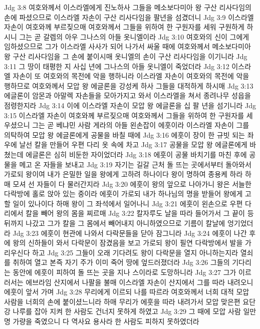 Jdg 3:8  여호와께서 이스라엘에게 진노하사 그들을 메소보다미아 왕 구산 리사다임의 손에 파셨으므로 이스라엘 자손이 구산 리사다임을 팔년을 섬겼더니
Jdg 3:9  이스라엘 자손이 여호와께 부르짖으매 여호와께서 그들을 위하여 한 구원자를 세워 구원하게 하시니 그는 곧 갈렙의 아우 그나스의 아들 옷니엘이라
Jdg 3:10  여호와의 신이 그에게 임하셨으므로 그가 이스라엘 사사가 되어 나가서 싸울 때에 여호와께서 메소보다미아 왕 구산 리사다임을 그 손에 붙이시매 옷니엘의 손이 구산 리사다임을 이기니라
Jdg 3:11  그 땅이 태평한 지 사십 년에 그나스의 아들 옷니엘이 죽었더라
Jdg 3:12  이스라엘 자손이 또 여호와의 목전에 악을 행하니라 이스라엘 자손이 여호와의 목전에 악을 행하므로 여호와께서 모압 왕 에글론을 강성케 하사 그들을 대적하게 하시매
Jdg 3:13  에글론이 암몬과 아말렉 자손들을 모아가지고 와서 이스라엘을 쳐서 종려나무 성읍을 점령한지라
Jdg 3:14  이에 이스라엘 자손이 모압 왕 에글론을 십 팔 년을 섬기니라
Jdg 3:15  이스라엘 자손이 여호와께 부르짖으매 여호와께서 그들을 위하여 한 구원자를 세우셨으니 그는 곧 베냐민 사람 게라의 아들 왼손잡이 에훗이라 이스라엘 자손이 그를 의탁하여 모압 왕 에글론에게 공물을 바칠 때에
Jdg 3:16  에훗이 장이 한 규빗 되는 좌우에 날선 칼을 만들어 우편 다리 옷 속에 차고
Jdg 3:17  공물을 모압 왕 에글론에게 바쳤는데 에글론은 심히 비둔한 자이었더라
Jdg 3:18  에훗이 공물 바치기를 마친 후에 공물을 메고 온 자들을 보내고
Jdg 3:19  자기는 길갈 근처 돌 뜨는 곳에서부터 돌아와서 가로되 왕이여 내가 은밀한 일을 왕에게 고하려 하나이다 왕이 명하여 종용케 하라 하매 모셔 선 자들이 다 물러간지라
Jdg 3:20  에훗이 왕의 앞으로 나아가니 왕은 서늘한 다락방에 홀로 앉아 있는 중이라 에훗이 가로되 내가 하나님의 명을 받들어 왕에게 고할 일이 있나이다 하매 왕이 그 좌석에서 일어나니
Jdg 3:21  에훗이 왼손으로 우편 다리에서 칼을 빼어 왕의 몸을 찌르매
Jdg 3:22  칼자루도 날을 따라 들어가서 그 끝이 등뒤까지 나갔고 그가 칼을 그 몸에서 빼어내지 아니하였으므로 기름이 칼날에 엉기었더라
Jdg 3:23  에훗이 현관에 나와서 다락문들을 닫아 잠그니라
Jdg 3:24  에훗이 나간 후에 왕의 신하들이 와서 다락문이 잠겼음을 보고 가로되 왕이 필연 다락방에서 발을 가리우신다 하고
Jdg 3:25  그들이 오래 기다려도 왕이 다락문을 열지 아니하는지라 열쇠를 취하여 열고 본즉 자기 주가 이미 죽어 땅에 엎드러졌더라
Jdg 3:26  그들의 기다리는 동안에 에훗이 피하여 돌 뜨는 곳을 지나 스이라로 도망하니라
Jdg 3:27  그가 이르러서는 에브라임 산지에서 나팔을 불매 이스라엘 자손이 산지에서 그를 따라 내려오니 에훗이 앞서 가며
Jdg 3:28  무리에게 이르되 나를 따르라 여호와께서 너희 대적 모압 사람을 너희의 손에 붙이셨느니라 하매 무리가 에훗을 따라 내려가서 모압 맞은편 요단강 나루를 잡아 지켜 한 사람도 건너지 못하게 하였고
Jdg 3:29  그 때에 모압 사람 일만 명 가량을 죽였으니 다 역사요 용사라 한 사람도 피하지 못하였더라
